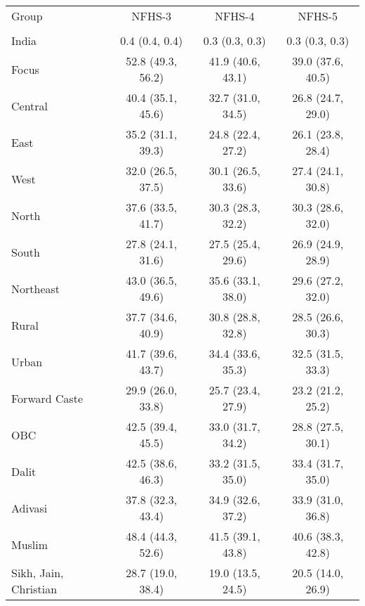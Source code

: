 \begin{tabular}{lccc}
\toprule
Group & NFHS-3 & NFHS-4 & NFHS-5 \\\\
\midrule
India&0.4 (0.4, 0.4)&0.3 (0.3, 0.3)&0.3 (0.3, 0.3)\\
Focus&52.8 (49.3, 56.2)&41.9 (40.6, 43.1)&39.0 (37.6, 40.5)\\
Central&40.4 (35.1, 45.6)&32.7 (31.0, 34.5)&26.8 (24.7, 29.0)\\
East&35.2 (31.1, 39.3)&24.8 (22.4, 27.2)&26.1 (23.8, 28.4)\\
West&32.0 (26.5, 37.5)&30.1 (26.5, 33.6)&27.4 (24.1, 30.8)\\
North&37.6 (33.5, 41.7)&30.3 (28.3, 32.2)&30.3 (28.6, 32.0)\\
South&27.8 (24.1, 31.6)&27.5 (25.4, 29.6)&26.9 (24.9, 28.9)\\
Northeast&43.0 (36.5, 49.6)&35.6 (33.1, 38.0)&29.6 (27.2, 32.0)\\
Rural&37.7 (34.6, 40.9)&30.8 (28.8, 32.8)&28.5 (26.6, 30.3)\\
Urban&41.7 (39.6, 43.7)&34.4 (33.6, 35.3)&32.5 (31.5, 33.3)\\
Forward Caste&29.9 (26.0, 33.8)&25.7 (23.4, 27.9)&23.2 (21.2, 25.2)\\
OBC&42.5 (39.4, 45.5)&33.0 (31.7, 34.2)&28.8 (27.5, 30.1)\\
Dalit&42.5 (38.6, 46.3)&33.2 (31.5, 35.0)&33.4 (31.7, 35.0)\\
Adivasi&37.8 (32.3, 43.4)&34.9 (32.6, 37.2)&33.9 (31.0, 36.8)\\
Muslim&48.4 (44.3, 52.6)&41.5 (39.1, 43.8)&40.6 (38.3, 42.8)\\
Sikh, Jain, Christian&28.7 (19.0, 38.4)&19.0 (13.5, 24.5)&20.5 (14.0, 26.9)\\
\bottomrule
\end{tabular}
